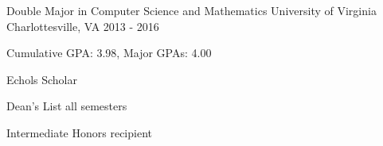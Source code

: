 

\begin{cventries}

  \cventry
    {Double Major in Computer Science and Mathematics} %
    {University of Virginia} %
    {Charlottesville, VA} %
    {2013 - 2016} %
    {
      \begin{cvitems} %
        \item {Cumulative GPA: 3.98, Major GPAs: 4.00}
	\item {Echols Scholar}
	\item {Dean's List all semesters}
	\item {Intermediate Honors recipient}
      \end{cvitems}
    }

\end{cventries}
